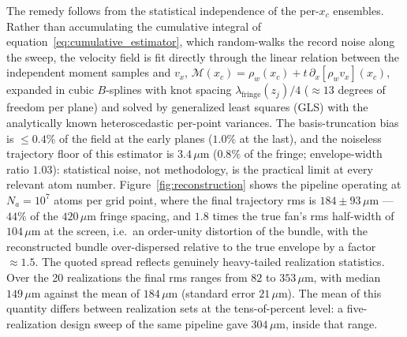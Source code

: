 \documentclass[11pt,a4paper]{article}
\begin{document}
The remedy follows from the statistical independence of the per-$x_c$ ensembles. Rather than accumulating the cumulative integral of equation~\eqref{eq:cumulative_estimator}, which random-walks the record noise along the sweep, the velocity field is fit directly through the linear relation between the independent moment samples and $v_x$, $\mathcal{M}(x_c) = \rho_w(x_c) + t\,\partial_x\!\left[\rho_w v_x\right](x_c)$, expanded in cubic $B$-splines with knot spacing $\lambda_\text{fringe}(z_j)/4$ ($\approx 13$ degrees of freedom per plane) and solved by generalized least squares (GLS) with the analytically known heteroscedastic per-point variances. The basis-truncation bias is $\leq 0.4\%$ of the field at the early planes ($1.0\%$ at the last), and the noiseless trajectory floor of this estimator is $3.4\,\mu$m ($0.8\%$ of the fringe; envelope-width ratio $1.03$): statistical noise, not methodology, is the practical limit at every relevant atom number. Figure~\ref{fig:reconstruction} shows the pipeline operating at $N_a = 10^7$ atoms per grid point, where the final trajectory rms is $184 \pm 93\,\mu$m --- $44\%$ of the $420\,\mu$m fringe spacing, and $1.8$ times the true fan's rms half-width of $104\,\mu$m at the screen, i.e.\ an order-unity distortion of the bundle, with the reconstructed bundle over-dispersed relative to the true envelope by a factor $\approx 1.5$. The quoted spread reflects genuinely heavy-tailed realization statistics. Over the 20 realizations the final rms ranges from $82$ to $353\,\mu$m, with median $149\,\mu$m against the mean of $184\,\mu$m (standard error $21\,\mu$m). The mean of this quantity differs between realization sets at the tens-of-percent level: a five-realization design sweep of the same pipeline gave $304\,\mu$m, inside that range.
\end{document}
